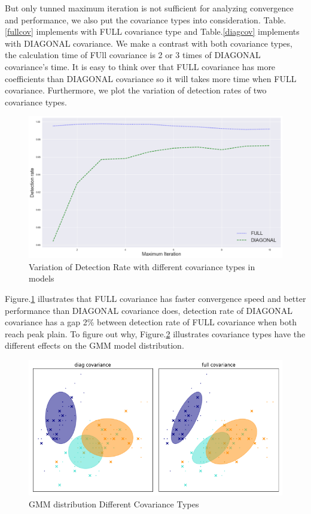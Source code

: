 \documentclass[12pt,DIV14,BCOR12mm,a4paper,footinclude=false,headinclude,parskip=half-,twoside,openright,cleardoublepage=empty,toc=index,bibliography=totoc,listof=totoc]{scrreprt}
\numberwithin{equation}{chapter}
\begin{document}
But only tunned maximum iteration is not sufficient for analyzing convergence and performance, we also put the covariance types into consideration. Table.\ref{fullcov} implements with FULL covariance type and Table.\ref{diagcov} implements with DIAGONAL covariance. We make a contrast with both covariance types, the calculation time of FUll covariance is 2 or 3 times of DIAGONAL covariance's time. It is easy to think over that FULL covariance has more coefficients than DIAGONAL covariance so it will takes more time when FULL covariance. Furthermore, we plot the variation of detection rates of two covariance types. 

\begin{figure}
	\centering
	\includegraphics[scale=0.4]{image/detect_cov}
	\caption{ Variation of Detection Rate with different covariance types in models}
	\label{detect_cov}
\end{figure}
Figure.\ref{detect_cov} illustrates that FULL covariance has faster convergence speed and better performance than DIAGONAL covariance does, detection rate of DIAGONAL covariance has a gap 2\% between detection rate of FULL covariance when both reach peak plain. To figure out why, Figure.\ref{cov_type} illustrates covariance types have the different effects on the GMM model distribution.

\begin{figure}
	\centering
	\includegraphics[scale=0.5]{image/cov_type}
	\caption{ GMM distribution Different Covariance Types}
	\label{cov_type}
\end{figure}
\end{document}
